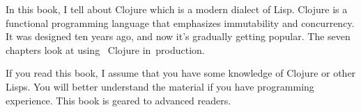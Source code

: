 \thispagestyle{empty}

In this book, I tell about Clojure which is a modern dialect of Lisp. Clojure is
a functional programming language that emphasizes immutability and
concurrency. It was designed ten years ago, and now it's gradually getting
popular. The seven chapters look at using ~Clojure in~production.

If you read this book, I assume that you have some knowledge of Clojure or other
Lisps. You will better understand the material if you have programming
experience. This book is geared to advanced readers.
